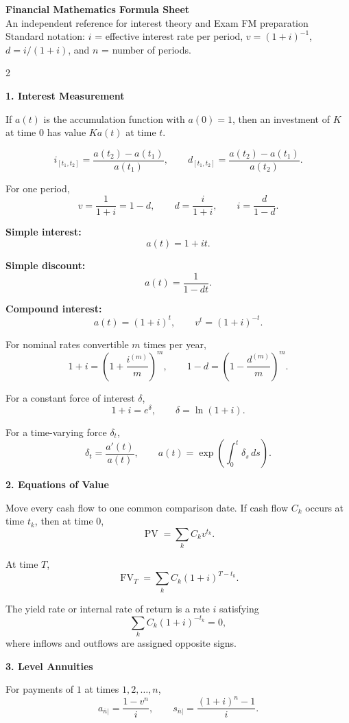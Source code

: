 \documentclass[10pt]{article}
\newcommand{\sect}[1]{%
  \vspace{4pt}%
  \noindent\colorbox{softgreen}{\parbox{\dimexpr\linewidth-2\fboxsep\relax}{\color{deepgreen}\bfseries #1}}%
  \vspace{3pt}%
}
\newcommand{\ann}[1]{a_{\overline{#1}|}}
\newcommand{\acc}[1]{s_{\overline{#1}|}}
\newcommand{\PV}{\operatorname{PV}}
\newcommand{\FV}{\operatorname{FV}}
\begin{document}
\begin{center}
{\LARGE\bfseries\color{deepgreen} Financial Mathematics Formula Sheet}\\[2pt]
{\small An independent reference for interest theory and Exam FM preparation}\\[4pt]
{\footnotesize Standard notation: $i$ = effective interest rate per period, $v=(1+i)^{-1}$, $d=i/(1+i)$, and $n$ = number of periods.}
\end{center}

\begin{multicols}{2}

\sect{1. Interest Measurement}

If $a(t)$ is the accumulation function with $a(0)=1$, then an investment of $K$ at time $0$ has value $K a(t)$ at time $t$.

\[ i_{[t_1,t_2]}=\frac{a(t_2)-a(t_1)}{a(t_1)}, \qquad d_{[t_1,t_2]}=\frac{a(t_2)-a(t_1)}{a(t_2)}. \]

For one period,
\[ v=\frac{1}{1+i}=1-d, \qquad d=\frac{i}{1+i}, \qquad i=\frac{d}{1-d}. \]

\textbf{Simple interest:}
\[ a(t)=1+it. \]

\textbf{Simple discount:}
\[ a(t)=\frac{1}{1-dt}. \]

\textbf{Compound interest:}
\[ a(t)=(1+i)^t, \qquad v^t=(1+i)^{-t}. \]

For nominal rates convertible $m$ times per year,
\[ 1+i=\left(1+\frac{i^{(m)}}{m}\right)^m, \qquad 1-d=\left(1-\frac{d^{(m)}}{m}\right)^m. \]

For a constant force of interest $\delta$,
\[ 1+i=e^{\delta}, \qquad \delta=\ln(1+i). \]

For a time-varying force $\delta_t$,
\[ \delta_t=\frac{a'(t)}{a(t)}, \qquad a(t)=\exp\!\left(\int_0^t \delta_s\,ds\right). \]

\sect{2. Equations of Value}

Move every cash flow to one common comparison date. If cash flow $C_k$ occurs at time $t_k$, then at time $0$,
\[ \PV=\sum_k C_k v^{t_k}. \]

At time $T$,
\[ \FV_T=\sum_k C_k(1+i)^{T-t_k}. \]

The yield rate or internal rate of return is a rate $i$ satisfying
\[ \sum_k C_k(1+i)^{-t_k}=0, \]
where inflows and outflows are assigned opposite signs.

\sect{3. Level Annuities}

For payments of $1$ at times $1,2,\ldots,n$,
\[ \ann{n}=\frac{1-v^n}{i}, \qquad \acc{n}=\frac{(1+i)^n-1}{i}. \]


\end{multicols}
\end{document}
